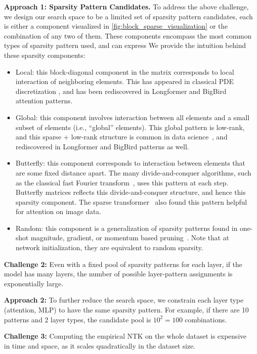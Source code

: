 \textbf{Approach 1: Sparsity Pattern Candidates.}
To address the above challenge, we design our search space to be a limited set of sparsity pattern candidates, each is either a component visualized in \cref{fig:block_sparse_visualization} or the combination of any two of them.
These components encompass the most common types of sparsity pattern used, and can express
We provide the intuition behind these sparsity components:
\begin{itemize}[leftmargin=*,nosep,nolistsep]
  \item Local: this block-diagonal component in the matrix corresponds to local interaction of neighboring elements. This has appeared in classical PDE discretization \citep{collins1971diagonal}, and has been rediscovered in Longformer and BigBird attention patterns.
  \item Global: this component involves interaction between all elements and a small subset of elements (i.e., ``global'' elements).
  This global pattern is low-rank, and this sparse + low-rank structure is common in data science~\citep{udell2019big}, and rediscovered in Longformer and BigBird patterns as well.
  \item Butterfly: this component corresponds to interaction between elements that are some fixed distance apart.
  The many divide-and-conquer algorithms, such as the classical fast Fourier transform~\citep{cooley1965algorithm}, uses this pattern at each step. Butterfly matrices reflects this divide-and-conquer structure, and hence this sparsity component. The sparse transformer~\citep{child2019generating} also found this pattern helpful for attention on image data.
  \item Random: this component is a generalization of sparsity patterns found in one-shot magnitude, gradient, or momentum based pruning~\citep{lee2018snip}. Note that at network initialization, they are equivalent to random sparsity.
\end{itemize}

\textbf{Challenge 2:} Even with a fixed pool of sparsity patterns for each layer, if the model has many layers, the number of possible layer-pattern assignments is exponentially large.

\textbf{Approach 2:} To further reduce the search space,
we constrain each layer type (attention, MLP) to have the same sparsity pattern.
For example, if there are 10 patterns and 2 layer types, the candidate pool is $10^2 = 100$ combinations.

\textbf{Challenge 3:} Computing the empirical NTK on the whole dataset is expensive in time and space, as it scales quadratically in the dataset size.

